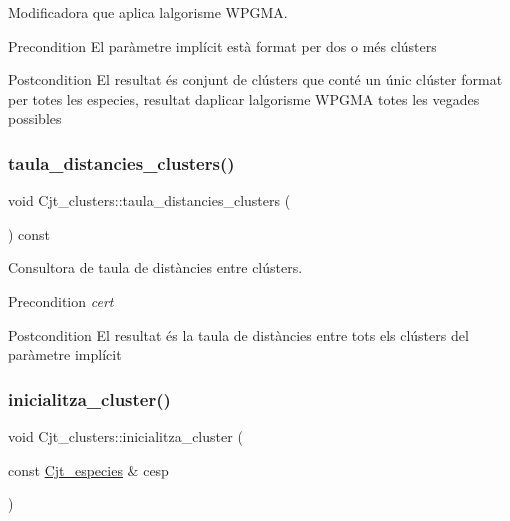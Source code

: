 Modificadora que aplica l\textquotesingle{}algorisme W\+P\+G\+MA. 

\begin{DoxyPrecond}{Precondition}
El paràmetre implícit està format per dos o més clústers 
\end{DoxyPrecond}
\begin{DoxyPostcond}{Postcondition}
El resultat és conjunt de clústers que conté un únic clúster format per totes les especies, resultat d\textquotesingle{}aplicar l\textquotesingle{}algorisme W\+P\+G\+MA totes les vegades possibles 
\end{DoxyPostcond}
\mbox{\label{class_cjt__clusters_ab243c775e0e2d64905ce744490d2f898}} 
\subsubsection{\texorpdfstring{taula\+\_\+distancies\+\_\+clusters()}{taula\_distancies\_clusters()}}
{\footnotesize\ttfamily void Cjt\+\_\+clusters\+::taula\+\_\+distancies\+\_\+clusters (\begin{DoxyParamCaption}{ }\end{DoxyParamCaption}) const}



Consultora de taula de distàncies entre clústers. 

\begin{DoxyPrecond}{Precondition}
{\itshape cert} 
\end{DoxyPrecond}
\begin{DoxyPostcond}{Postcondition}
El resultat és la taula de distàncies entre tots els clústers del paràmetre implícit 
\end{DoxyPostcond}
\mbox{\label{class_cjt__clusters_a0c0922c708fb014720a53bd560ebed61}} 
\subsubsection{\texorpdfstring{inicialitza\+\_\+cluster()}{inicialitza\_cluster()}}
{\footnotesize\ttfamily void Cjt\+\_\+clusters\+::inicialitza\+\_\+cluster (\begin{DoxyParamCaption}\item[{const \hyperlink{class_cjt__especies}{Cjt\+\_\+especies} \&}]{cesp }\end{DoxyParamCaption})}



